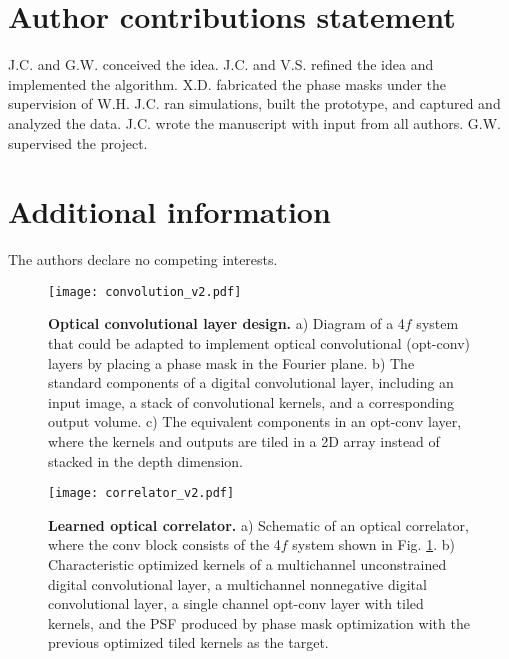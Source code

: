 \documentclass[fleqn,10pt]{wlscirep}
\begin{document}
\section*{Author contributions statement}
J.C. and G.W. conceived the idea. J.C. and V.S. refined the idea and implemented the algorithm. X.D. fabricated the phase masks under the supervision of W.H. J.C. ran simulations, built the prototype, and captured and analyzed the data. J.C. wrote the manuscript with input from all authors. G.W. supervised the project.

\section*{Additional information}
The authors declare no competing interests.



\begin{figure}[t]
\centering
\texttt{[image: convolution\_v2.pdf]}
\caption{\textbf{Optical convolutional layer design.} a) Diagram of a 4$f$ system that could be adapted to implement optical convolutional (opt-conv) layers by placing a phase mask in the Fourier plane. b) The standard components of a digital convolutional layer, including an input image, a stack of convolutional kernels, and a corresponding output volume. c) The equivalent components in an opt-conv layer, where the kernels and outputs are tiled in a 2D array instead of stacked in the depth dimension.}
\label{fig:convolution}
\end{figure}

\begin{figure}
\centering
\texttt{[image: correlator\_v2.pdf]}
\caption{\textbf{Learned optical correlator.} a) Schematic of an optical correlator, where the conv block consists of the 4$f$ system shown in Fig. \ref{fig:convolution}. b) Characteristic optimized kernels of a multichannel unconstrained digital convolutional layer, a multichannel nonnegative digital convolutional layer, a single channel opt-conv layer with tiled kernels, and the PSF produced by phase mask optimization with the previous optimized tiled kernels as the target.}
\label{fig:correlator}
\end{figure}
\end{document}
